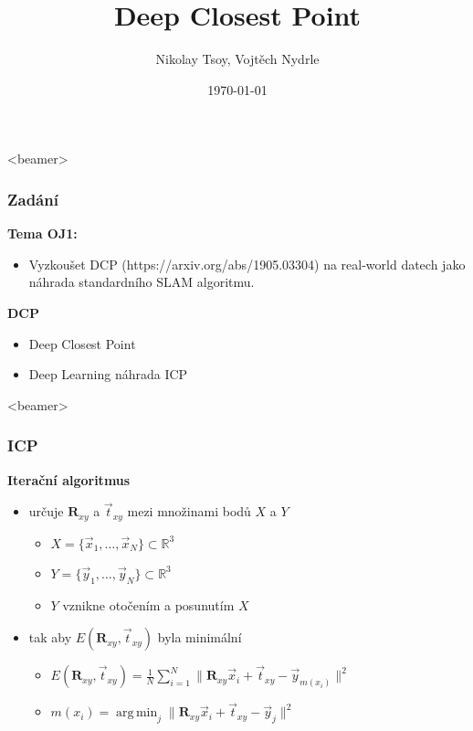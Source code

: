 \documentclass[t]{beamer}
\title{Deep Closest Point}
\author{Nikolay Tsoy, Vojtěch Nydrle}
\date{\today}
\DeclareMathOperator*{\argmin}{arg\,min}
\newcommand{\norm}[1]{\lVert #1 \rVert}
\begin{document}
\begin{frame}
	\thispagestyle{empty}
  \titlepage
\end{frame}

    
\begin{frame}<beamer>
  \frametitle{Zadání}
	\textbf{Tema OJ1:}
  \begin{itemize}
 \item Vyzkoušet DCP (https://arxiv.org/abs/1905.03304) na real-world datech jako náhrada standardního SLAM algoritmu.
  \end{itemize}
  
  
  \textbf{DCP}
    \begin{itemize}
 \item Deep Closest Point
 \item Deep Learning náhrada ICP
  \end{itemize}  
\end{frame}


\begin{frame}<beamer>
  \frametitle{ICP}
	\textbf{Iterační algoritmus}
  \begin{itemize}
	 \item určuje $\textbf{R}_{xy}$ a $\vec{t}_{xy}$ mezi množinami bodů $X$ a $Y$
	\begin{itemize}
  		 \item $X=\lbrace \vec x_1, \ldots, \vec x_N \rbrace \subset \mathbb{R}^3$
  		\onslide<3-> \item $Y=\lbrace \vec y_1, \ldots, \vec y_N \rbrace \subset \mathbb{R}^3$
  		\onslide<3-> \item $Y$ vznikne otočením a posunutím $X$
  \end{itemize}
  
  
   \item tak aby $E(\textbf{R}_{xy},\vec{t}_{xy})$ byla minimální
	\begin{itemize}
  		 \item $\displaystyle E(\textbf{R}_{xy},\vec{t}_{xy})=\frac{1}{N}\sum_{i=1}^N \norm{\textbf{R}_{xy}\vec x_i+\vec{t}_{xy} -\vec y_{m(x_i)}}^2 $
  		
  		
  		 \item $\displaystyle m(x_i)=\argmin_j \norm{\textbf{R}_{xy}\vec x_i+\vec{t}_{xy} -\vec y_j}^2 $
  \end{itemize}
  \end{itemize}  
\end{frame}
\end{document}
